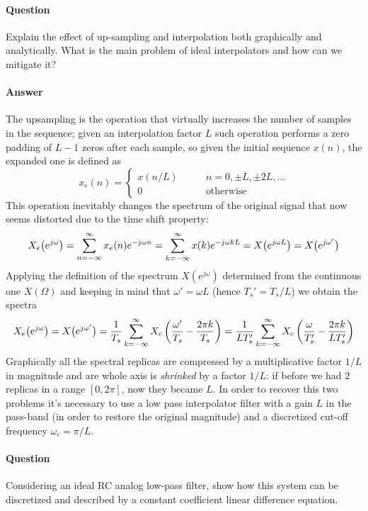 	
	
\newquestion
	\paragraph{Question} Explain the effect of up-sampling and interpolation both graphically and analytically. What is the main problem of ideal interpolators and how can we mitigate it?
	
	\paragraph{Answer} The upsampling is the operation that virtually increases the number of samples in the sequence; given an interpolation factor $L$ such operation performs a zero padding of $L-1$ zeros after each sample, so given the initial sequence $x(n)$, the expanded one is defined as
	\[ x_e(n) = \begin{cases}
		x(n/L) \qquad & n = 0,\pm L, \pm 2L,\dots \\ 0 & \textrm{otherwise}
	\end{cases} \]
	This operation inevitably changes the spectrum of the original signal that now seems distorted due to the time shift property:
	\[  X_e\big(e^{j\omega}\big) = \sum_{n=-\infty}^\infty x_e(n) e^{-j\omega n} = \sum_{k=-\infty}^\infty x(k) e^{-j\omega k L} = X\big(e^{j\omega L}\big) = X\big(e^{j\omega'}\big) \]
	Applying the definition of the spectrum $X(e^{j\omega})$ determined from the continuous one $X(\Omega)$ and keeping in mind that $\omega' = \omega L$ (hence $T_s' = T_s/L$) we obtain the spectra
	\[ X_e\big(e^{j\omega}\big) = X\big( e^{j\omega'}\big) = \frac 1 {T_s} \sum_{k=-\infty}^\infty X_c\left( \frac{\omega'}{T_s} - \frac{2\pi k}{T_s} \right) = \frac 1{LT_s'} \sum_{k=-\infty}^\infty X_c \left( \frac \omega {T_s'} - \frac{2\pi k}{LT_s'} \right) \]
	Graphically all the spectral replicas are compressed by a multiplicative factor $1/L$ in magnitude and are whole axis is \textit{shrinked} by a factor $1/L$: if before we had 2 replicas in a range $[0,2\pi]$, now they became $L$. In order to recover this two problems it's necessary to use a low pass interpolator filter with a gain $L$ in the pass-band (in order to restore the original magnitude) and a discretized cut-off frequency $\omega_c = \pi /L$.
	
\newquestion
	\paragraph{Question} Considering an ideal RC analog low-pass filter, show how this system can be discretized and described by a constant coefficient linear difference equation.


